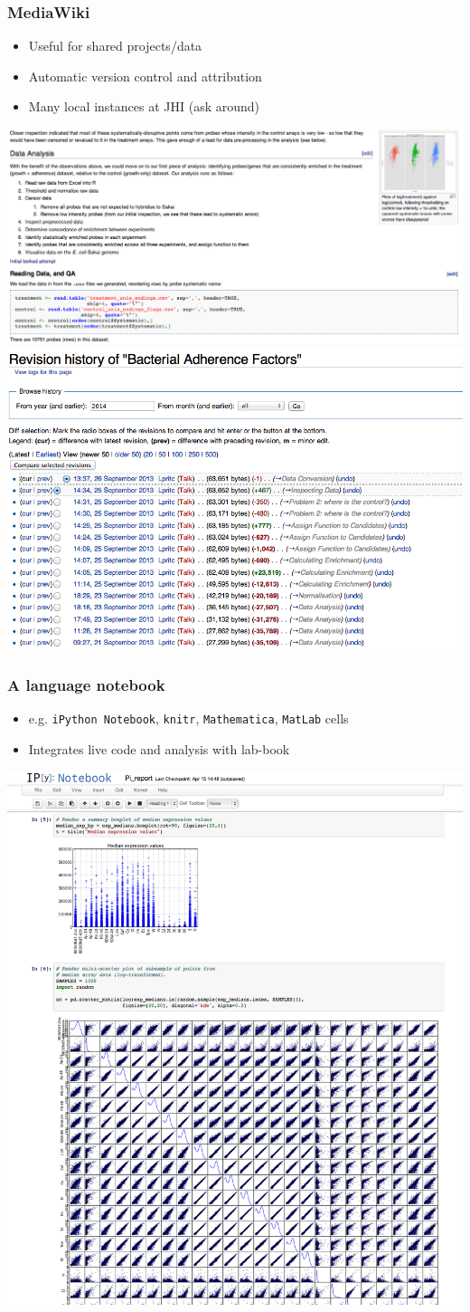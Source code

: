 \begin{frame}
  \frametitle{MediaWiki}
  \begin{itemize}
    \item Useful for shared projects/data
    \item Automatic version control and attribution
    \item Many local instances at JHI (ask around)
  \end{itemize}
  \begin{center}
    \includegraphics[width=.4\textwidth]{images/mediawiki_after}
    \includegraphics[width=.4\textwidth]{images/mediawiki_version_control}     
  \end{center}
\end{frame}
   
\begin{frame}
  \frametitle{A language notebook}
  \begin{itemize}
    \item e.g. \texttt{iPython Notebook}, \texttt{knitr}, \texttt{Mathematica}, \texttt{MatLab} cells
    \item Integrates live code and analysis with lab-book
  \end{itemize}
  \begin{center}
    \includegraphics[width=.35\textwidth]{images/ipython_notebook}     
  \end{center}
\end{frame}

